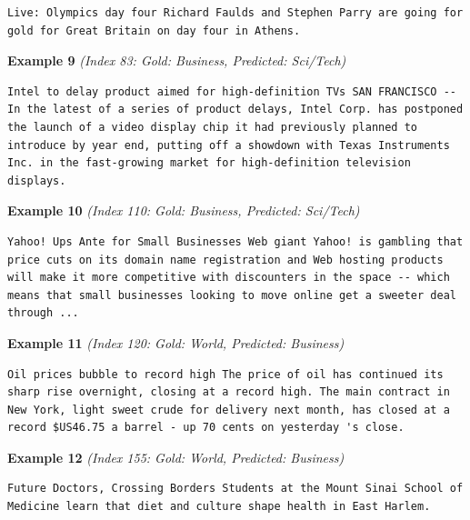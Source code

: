 \begin{Verbatim}[breaklines=true,breakanywhere=true,fontsize=\small]
Live: Olympics day four Richard Faulds and Stephen Parry are going for gold for Great Britain on day four in Athens.
\end{Verbatim}

\noindent
\textbf{Example 9} \quad \textit{(Index 83: Gold: Business, Predicted: Sci/Tech)}

\begin{Verbatim}[breaklines=true,breakanywhere=true,fontsize=\small]
Intel to delay product aimed for high-definition TVs SAN FRANCISCO -- In the latest of a series of product delays, Intel Corp. has postponed the launch of a video display chip it had previously planned to introduce by year end, putting off a showdown with Texas Instruments Inc. in the fast-growing market for high-definition television displays.
\end{Verbatim}

\noindent
\textbf{Example 10} \quad \textit{(Index 110: Gold: Business, Predicted: Sci/Tech)}

\begin{Verbatim}[breaklines=true,breakanywhere=true,fontsize=\small]
Yahoo! Ups Ante for Small Businesses Web giant Yahoo! is gambling that price cuts on its domain name registration and Web hosting products will make it more competitive with discounters in the space -- which means that small businesses looking to move online get a sweeter deal through ...
\end{Verbatim}

\noindent
\textbf{Example 11} \quad \textit{(Index 120: Gold: World, Predicted: Business)}

\begin{Verbatim}[breaklines=true,breakanywhere=true,fontsize=\small]
Oil prices bubble to record high The price of oil has continued its sharp rise overnight, closing at a record high. The main contract in New York, light sweet crude for delivery next month, has closed at a record $US46.75 a barrel - up 70 cents on yesterday 's close.
\end{Verbatim}

\noindent
\textbf{Example 12} \quad \textit{(Index 155: Gold: World, Predicted: Business)}

\begin{Verbatim}[breaklines=true,breakanywhere=true,fontsize=\small]
Future Doctors, Crossing Borders Students at the Mount Sinai School of Medicine learn that diet and culture shape health in East Harlem.
\end{Verbatim}

